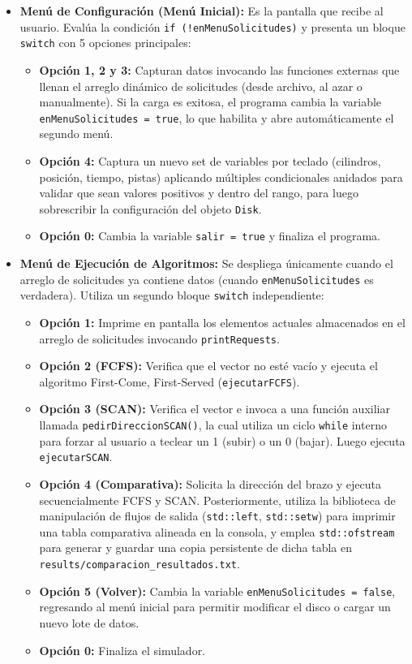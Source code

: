 \documentclass[14pt,letterpaper]{extarticle}
\begin{document}
\begin{itemize}
    \item \textbf{Menú de Configuración (Menú Inicial):} Es la pantalla que recibe al usuario. Evalúa la condición \texttt{if (!enMenuSolicitudes)} y presenta un bloque \texttt{switch} con 5 opciones principales:
    \begin{itemize}
        \item \textbf{Opción 1, 2 y 3:} Capturan datos invocando las funciones externas que llenan el arreglo dinámico de solicitudes (desde archivo, al azar o manualmente). Si la carga es exitosa, el programa cambia la variable \texttt{enMenuSolicitudes = true}, lo que habilita y abre automáticamente el segundo menú.
        \item \textbf{Opción 4:} Captura un nuevo set de variables por teclado (cilindros, posición, tiempo, pistas) aplicando múltiples condicionales anidados para validar que sean valores positivos y dentro del rango, para luego sobrescribir la configuración del objeto \texttt{Disk}.
        \item \textbf{Opción 0:} Cambia la variable \texttt{salir = true} y finaliza el programa.
    \end{itemize}
    \item \textbf{Menú de Ejecución de Algoritmos:} Se despliega únicamente cuando el arreglo de solicitudes ya contiene datos (cuando \texttt{enMenuSolicitudes} es verdadera). Utiliza un segundo bloque \texttt{switch} independiente:
    \begin{itemize}
        \item \textbf{Opción 1:} Imprime en pantalla los elementos actuales almacenados en el arreglo de solicitudes invocando \texttt{printRequests}.
        \item \textbf{Opción 2 (FCFS):} Verifica que el vector no esté vacío y ejecuta el algoritmo First-Come, First-Served (\texttt{ejecutarFCFS}).
        \item \textbf{Opción 3 (SCAN):} Verifica el vector e invoca a una función auxiliar llamada \texttt{pedirDireccionSCAN()}, la cual utiliza un ciclo \texttt{while} interno para forzar al usuario a teclear un 1 (subir) o un 0 (bajar). Luego ejecuta \texttt{ejecutarSCAN}.
        \item \textbf{Opción 4 (Comparativa):} Solicita la dirección del brazo y ejecuta secuencialmente FCFS y SCAN. Posteriormente, utiliza la biblioteca de manipulación de flujos de salida (\texttt{std::left}, \texttt{std::setw}) para imprimir una tabla comparativa alineada en la consola, y emplea \texttt{std::ofstream} para generar y guardar una copia persistente de dicha tabla en \texttt{results/comparacion\_resultados.txt}.
        \item \textbf{Opción 5 (Volver):} Cambia la variable \texttt{enMenuSolicitudes = false}, regresando al menú inicial para permitir modificar el disco o cargar un nuevo lote de datos.
        \item \textbf{Opción 0:} Finaliza el simulador.
    \end{itemize}
\end{itemize}
\end{document}
